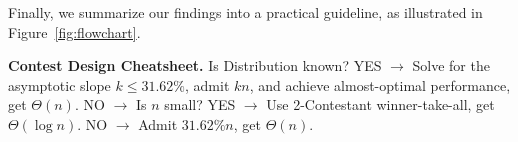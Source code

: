 Finally, we summarize our findings into a practical guideline, as illustrated in Figure~\ref{fig:flowchart}.

\noindent \textbf{Contest Design Cheatsheet.} 
Is Distribution known? YES $\to$ Solve for the asymptotic slope $k \leq 31.62\%$, admit $kn$, and achieve almost-optimal performance, get $\Theta(n)$. NO $\to$ Is $n$ small? YES $\to$ Use 2-Contestant winner-take-all, get $\Theta(\log n)$. NO $\to$ Admit $31.62\%n$, get $\Theta(n)$. 






